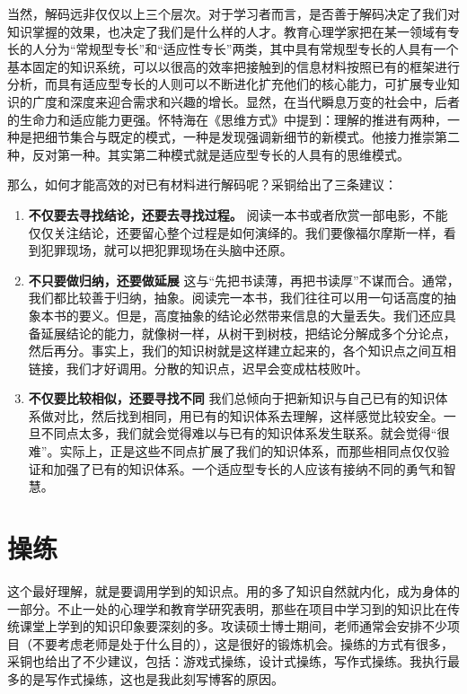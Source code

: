 \documentclass[10pt,a4paper,UTF8]{article}
\begin{document}
当然，解码远非仅仅以上三个层次。对于学习者而言，是否善于解码决定了我们对知识掌握的效果，也决定了我们是什么样的人才。教育心理学家把在某一领域有专长的人分为“常规型专长”和“适应性专长”两类，其中具有常规型专长的人具有一个基本固定的知识系统，可以以很高的效率把接触到的信息材料按照已有的框架进行分析，而具有适应型专长的人则可以不断进化扩充他们的核心能力，可扩展专业知识的广度和深度来迎合需求和兴趣的增长。显然，在当代瞬息万变的社会中，后者的生命力和适应能力更强。怀特海在《思维方式》中提到：理解的推进有两种，一种是把细节集合与既定的模式，一种是发现强调新细节的新模式。他接力推崇第二种，反对第一种。其实第二种模式就是适应型专长的人具有的思维模式。

那么，如何才能高效的对已有材料进行解码呢？采铜给出了三条建议：

\begin{enumerate}
\item \textbf{不仅要去寻找结论，还要去寻找过程。} 阅读一本书或者欣赏一部电影，不能仅仅关注结论，还要留心整个过程是如何演绎的。我们要像福尔摩斯一样，看到犯罪现场，就可以把犯罪现场在头脑中还原。

\item \textbf{不只要做归纳，还要做延展} 这与“先把书读薄，再把书读厚”不谋而合。通常，我们都比较善于归纳，抽象。阅读完一本书，我们往往可以用一句话高度的抽象本书的要义。但是，高度抽象的结论必然带来信息的大量丢失。我们还应具备延展结论的能力，就像树一样，从树干到树枝，把结论分解成多个分论点，然后再分。事实上，我们的知识树就是这样建立起来的，各个知识点之间互相链接，我们才好调用。分散的知识点，迟早会变成枯枝败叶。

\item \textbf{不仅要比较相似，还要寻找不同} 我们总倾向于把新知识与自己已有的知识体系做对比，然后找到相同，用已有的知识体系去理解，这样感觉比较安全。一旦不同点太多，我们就会觉得难以与已有的知识体系发生联系。就会觉得“很难”。实际上，正是这些不同点扩展了我们的知识体系，而那些相同点仅仅验证和加强了已有的知识体系。一个适应型专长的人应该有接纳不同的勇气和智慧。
\end{enumerate}

\section{操练}
\label{sec:orgheadline5}


这个最好理解，就是要调用学到的知识点。用的多了知识自然就内化，成为身体的一部分。不止一处的心理学和教育学研究表明，那些在项目中学习到的知识比在传统课堂上学到的知识印象要深刻的多。攻读硕士博士期间，老师通常会安排不少项目（不要考虑老师是处于什么目的），这是很好的锻炼机会。操练的方式有很多，采铜也给出了不少建议，包括：游戏式操练，设计式操练，写作式操练。我执行最多的是写作式操练，这也是我此刻写博客的原因。
\end{document}
